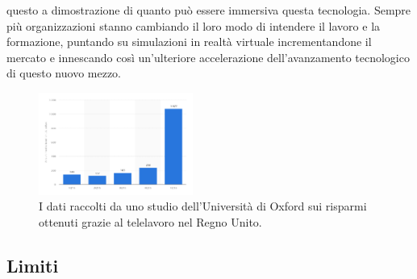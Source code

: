 questo a dimostrazione di quanto può essere immersiva questa tecnologia.
Sempre più organizzazioni stanno cambiando il loro modo di intendere il lavoro e la formazione, puntando su simulazioni in realtà virtuale incrementandone il mercato e innescando così un'ulteriore accelerazione dell'avanzamento tecnologico di questo nuovo mezzo. 
\begin{figure}[H]
	\includegraphics[width=0.45\textwidth]{figure/investimenti}
	\centering
	\caption{I dati raccolti da uno studio dell'Università di Oxford sui risparmi ottenuti grazie al telelavoro nel Regno Unito.}
\end{figure}

\subsection{Limiti}

